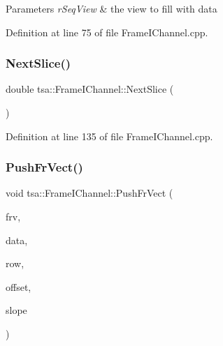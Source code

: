 \begin{DoxyParams}{Parameters}
{\em r\+Seq\+View} & the view to fill with data \\
\hline
\end{DoxyParams}


Definition at line 75 of file Frame\+I\+Channel.\+cpp.

\mbox{\label{classtsa_1_1_frame_i_channel_a8caf984495dce2862909b0d7192c9fb4}} 
\subsubsection{\texorpdfstring{Next\+Slice()}{NextSlice()}}
{\footnotesize\ttfamily double tsa\+::\+Frame\+I\+Channel\+::\+Next\+Slice (\begin{DoxyParamCaption}{ }\end{DoxyParamCaption})}



Definition at line 135 of file Frame\+I\+Channel.\+cpp.

\mbox{\label{classtsa_1_1_frame_i_channel_aaca5759288add902732cc640633f17d4}} 
\subsubsection{\texorpdfstring{Push\+Fr\+Vect()}{PushFrVect()}}
{\footnotesize\ttfamily void tsa\+::\+Frame\+I\+Channel\+::\+Push\+Fr\+Vect (\begin{DoxyParamCaption}\item[{Fr\+Vect $\ast$}]{frv,  }\item[{\hyperlink{namespacetsa_ad260cd21c1891c4ed391fe788569aba4}{Dmatrix} \&}]{data,  }\item[{unsigned int}]{row,  }\item[{double}]{offset,  }\item[{double}]{slope }\end{DoxyParamCaption})\hspace{0.3cm}{\ttfamily [private]}}



